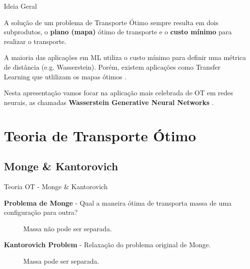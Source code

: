 \documentclass[10pt]{beamer}
\begin{document}
\begin{frame}[fragile]{Ideia Geral}

	A solução de um problema de Transporte Ótimo sempre resulta
	em dois subprodutos, o \textbf{plano (mapa)} ótimo de transporte
	e o \textbf{custo mínimo} para realizar o transporte.

	\vspace{3mm}
	A maioria das aplicações em ML utiliza o custo mínimo para
	definir uma métrica de distância (e.g. Wasserstein). Porém,
	existem aplicações como Transfer Learning que utlilizam
	os mapas ótimos \citep{sales2021optimal}.

	\vspace{3mm}
	Nesta apresentação vamos focar na aplicação mais celebrada
	de OT em redes neurais, as chamadas
	\textbf{Wasserstein Generative Neural Networks} \citep{arjovsky2017wasserstein}.

\end{frame}

\AtBeginSection{}
\section[Teoria de Transporte Ótimo]{Teoria de Transporte Ótimo}
\subsection[Teoria OT]{Monge \& Kantorovich}
\begin{frame}[fragile]{Teoria OT - Monge \& Kantorovich}

	\textbf{Problema de Monge} -
	Qual a maneira ótima de transporta massa de uma configuração
	para outra?
	\vspace{3mm}

	\begin{figure}[H]
		\centering
		\def\svgscale{0.4}
		
		\caption{Massa não pode ser separada.}
		\label{fig:mongeproblem}
	\end{figure}

	\textbf{Kantorovich Problem} -
	Relaxação do problema original de Monge.
	\vspace{3mm}

	\begin{figure}[H]
		\centering
		\def\svgscale{0.4}
		
		\caption{Massa pode ser separada.}
		\label{fig:kantorovichproblem}
	\end{figure}

\end{frame}
\end{document}

